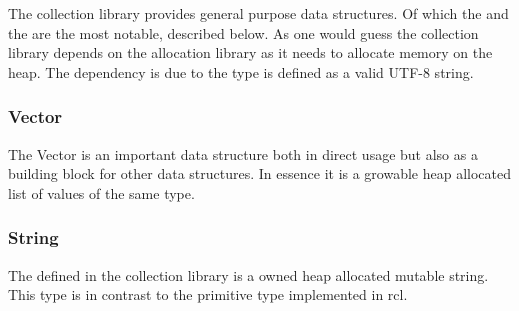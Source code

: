 The {\rust} collection library provides general purpose data structures.
Of which the  and the  are the most notable, described below.
As one would guess the collection library depends on the allocation library as it needs to allocate memory on the heap.
The  dependency is due to the  type is defined as a valid UTF-8 string.

\subsubsection{Vector}

The Vector is an important data structure both in direct usage but also as a building block for other data structures.
In essence it is a growable heap allocated list of values of the same type.

\subsubsection{String}

The  defined in the collection library is a owned heap allocated mutable string.
This type is in contrast to the primitive  type implemented in \gls{rcl}.
